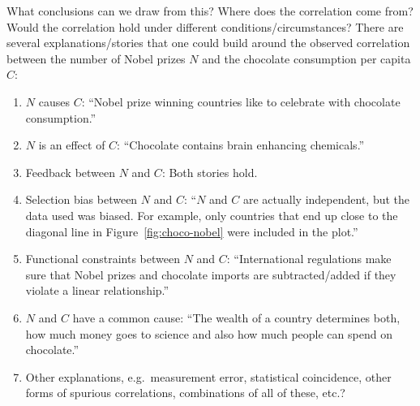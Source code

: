\begin{Expl}\label{explanation:nobel_chocolate}
    What conclusions can we draw from this? Where does the correlation come from? Would the correlation hold under different conditions/circumstances?
    There are several explanations/stories that one could build around the observed correlation between the number of Nobel prizes $N$ and the chocolate consumption per capita $C$:
    \begin{enumerate}[label=\alph*)]
        \item $N$ causes $C$: ``Nobel prize winning countries like to celebrate with chocolate consumption.''
        \item $N$ is an effect of $C$: ``Chocolate contains brain enhancing chemicals.''
        \item Feedback between $N$ and $C$: Both stories hold.
        \item Selection bias between $N$ and $C$: ``$N$ and $C$ are actually independent, but the data used was biased. For example, only countries that end up close to the diagonal line in Figure~\ref{fig:choco-nobel} were included in the plot.''
        \item Functional constraints between $N$ and $C$: ``International regulations make sure that Nobel prizes and chocolate imports are subtracted/added if they violate a linear relationship.''
        \item $N$ and $C$ have a common cause: ``The wealth of a country determines both, how much money goes to science and also how much people can spend on chocolate.''
        \item Other explanations, e.g.\ measurement error, statistical coincidence, other forms of spurious correlations, combinations of all of these, etc.?
    \end{enumerate}
\end{Expl}




